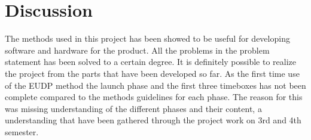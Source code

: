 \chapter{Discussion}
%
The methods used in this project has been showed to be useful for developing software and hardware for the product. All the problems in the problem statement has been solved to a certain degree. It is definitely possible to realize the project from the parts that have been developed so far. As the first time use of the EUDP method the launch phase and the first three timeboxes has not been complete compared to the methods guidelines for each phase. The reason for this was missing understanding of the different phases and their content, a understanding that have been gathered through the project work on 3rd and 4th semester.